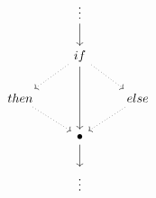 \[\begin{tikzcd}
	& {\vdots } \\
	& if \\
	then && else \\
	& \bullet \\
	& \vdots
	\arrow[from=1-2, to=2-2]
	\arrow[from=4-2, to=5-2]
	\arrow[from=2-2, to=4-2]
	\arrow[dotted, from=2-2, to=3-1]
	\arrow[dotted, from=3-1, to=4-2]
	\arrow[dotted, from=2-2, to=3-3]
	\arrow[dotted, from=3-3, to=4-2]
\end{tikzcd}\]